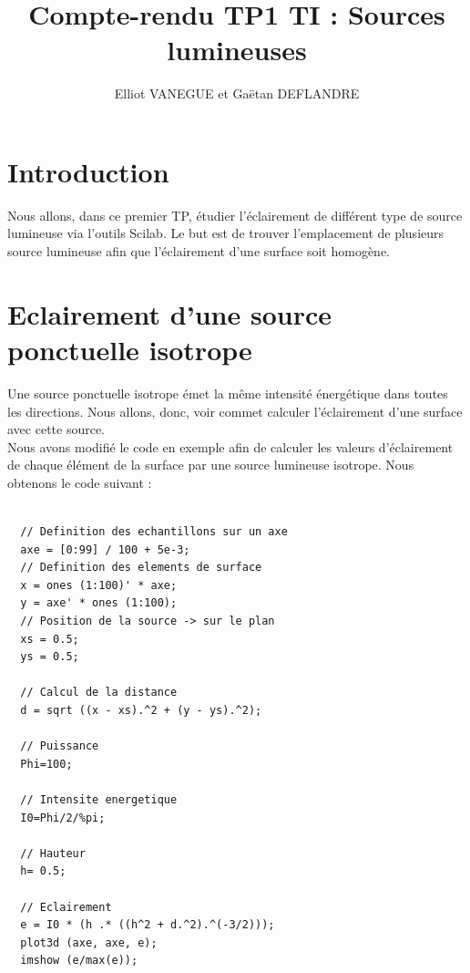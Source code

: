 \documentclass[a4paper,11pt]{article}
\title{Compte-rendu TP1 TI : Sources lumineuses}
\author{Elliot VANEGUE et Gaëtan DEFLANDRE}
\begin{document}


  \maketitle
  
  \mbox{}
  \newpage
  \clearpage
  
  \section*{Introduction}
  Nous allons, dans ce premier TP, étudier l'éclairement de différent type
  de source lumineuse via l'outils Scilab. Le but est de trouver l'emplacement
  de plusieurs source lumineuse afin que l'éclairement d'une surface soit homogène.\\
  
  \section{Eclairement d'une source ponctuelle isotrope}
  Une source ponctuelle isotrope émet la même intensité énergétique dans toutes les 
  directions. Nous allons, donc, voir commet calculer l'éclairement d'une surface
  avec cette source.\\
  
  Nous avons modifié le code en exemple afin de calculer les valeurs d'éclairement de 
  chaque élément de la surface par une source lumineuse isotrope. Nous obtenons le code 
  suivant :
  
  \begin{lstlisting}[caption=Code Scilab eclairement source isotrope]
  
  // Definition des echantillons sur un axe
  axe = [0:99] / 100 + 5e-3;
  // Definition des elements de surface
  x = ones (1:100)' * axe;
  y = axe' * ones (1:100);
  // Position de la source -> sur le plan
  xs = 0.5;
  ys = 0.5;

  // Calcul de la distance
  d = sqrt ((x - xs).^2 + (y - ys).^2);

  // Puissance
  Phi=100;

  // Intensite energetique
  I0=Phi/2/%pi;

  // Hauteur
  h= 0.5;

  // Eclairement
  e = I0 * (h .* ((h^2 + d.^2).^(-3/2)));
  plot3d (axe, axe, e);
  imshow (e/max(e));

  \end{lstlisting}
  
\end{document}
